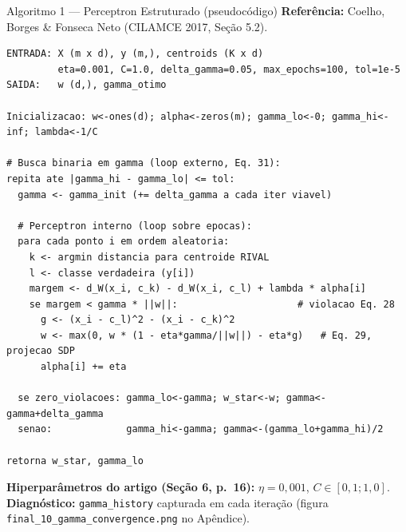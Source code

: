 \documentclass[aspectratio=169,10pt]{beamer}
\begin{document}
\begin{frame}[fragile]{Algoritmo 1 --- Perceptron Estruturado (pseudoc\'odigo)}
  \tiny
  \textbf{Refer\^encia:} Coelho, Borges \& Fonseca Neto (CILAMCE 2017, Se\c{c}\~ao 5.2).
\begin{verbatim}
ENTRADA: X (m x d), y (m,), centroids (K x d)
         eta=0.001, C=1.0, delta_gamma=0.05, max_epochs=100, tol=1e-5
SAIDA:   w (d,), gamma_otimo

Inicializacao: w<-ones(d); alpha<-zeros(m); gamma_lo<-0; gamma_hi<-inf; lambda<-1/C

# Busca binaria em gamma (loop externo, Eq. 31):
repita ate |gamma_hi - gamma_lo| <= tol:
  gamma <- gamma_init (+= delta_gamma a cada iter viavel)

  # Perceptron interno (loop sobre epocas):
  para cada ponto i em ordem aleatoria:
    k <- argmin distancia para centroide RIVAL
    l <- classe verdadeira (y[i])
    margem <- d_W(x_i, c_k) - d_W(x_i, c_l) + lambda * alpha[i]
    se margem < gamma * ||w||:                     # violacao Eq. 28
      g <- (x_i - c_l)^2 - (x_i - c_k)^2
      w <- max(0, w * (1 - eta*gamma/||w||) - eta*g)   # Eq. 29, projecao SDP
      alpha[i] += eta

  se zero_violacoes: gamma_lo<-gamma; w_star<-w; gamma<-gamma+delta_gamma
  senao:             gamma_hi<-gamma; gamma<-(gamma_lo+gamma_hi)/2

retorna w_star, gamma_lo
\end{verbatim}
  \textbf{Hiperpar\^ametros do artigo (Se\c{c}\~ao 6, p.\ 16):} $\eta = 0{,}001$, $C \in [0{,}1; 1{,}0]$.\\
  \textbf{Diagn\'ostico:} \texttt{gamma\_history} capturada em cada itera\c{c}\~ao (figura \texttt{final\_10\_gamma\_convergence.png} no Ap\^endice).
\end{frame}
\end{document}
